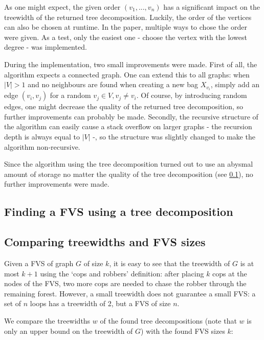 As one might expect, the given order $(v_1,...,v_n)$ has a significant impact on the treewidth of the returned tree decomposition. Luckily, the order of the vertices can also be chosen at runtime. In the paper, multiple ways to chose the order were given. As a test, only the easiest one - choose the vertex with the lowest degree - was implemented.

During the implementation, two small improvements were made. First of all, the algorithm expects a connected graph. One can extend this to all graphs: when $|V| > 1$ and no neighbours are found when creating a new bag $X_{v_i}$, simply add an edge $(v_i,v_j)$ for a random $v_j \in V, v_j \neq v_i$. Of course, by introducing random edges, one might decrease the quality of the returned tree decomposition, so further improvements can probably be made.
Secondly, the recursive structure of the algorithm can easily cause a stack overflow on larger graphs - the recursion depth is always equal to $|V|$ -, so the structure was slightly changed to make the algorithm non-recursive.

Since the algorithm using the tree decomposition turned out to use an abysmal amount of storage no matter the quality of the tree decomposition (see \ref{sec:treewidth2}), no further improvements were made. 

\subsection{Finding a FVS using a tree decomposition} \label{sec:treewidth2}

\subsection{Comparing treewidths and FVS sizes} \label{sec:treewidth3}
Given a FVS of graph $G$ of size $k$, it is easy to see that the treewidth of $G$ is at most $k+1$ using the `cops and robbers' definition: after placing $k$ cops at the nodes of the FVS, two more cops are needed to chase the robber through the remaining forest. However, a small treewidth does not guarantee a small FVS: a set of $n$ loops has a treewidth of 2, but a FVS of size $n$.

We compare the treewidths $w$ of the found tree decompositions (note that $w$ is only an upper bound on the treewidth of $G$) with the found FVS sizes $k$:

